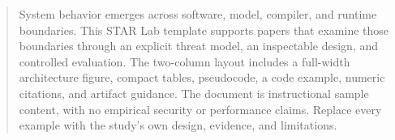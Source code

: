 \begin{abstract}
System behavior emerges across software, model, compiler, and runtime
boundaries. This STAR Lab template supports papers that examine those
boundaries through an explicit threat model, an inspectable design, and
controlled evaluation. The two-column layout includes a full-width
architecture figure, compact tables, pseudocode, a code example, numeric
citations, and artifact guidance. The document is instructional sample
content, with no empirical security or performance claims. Replace every
example with the study's own design, evidence, and limitations.
\end{abstract}

